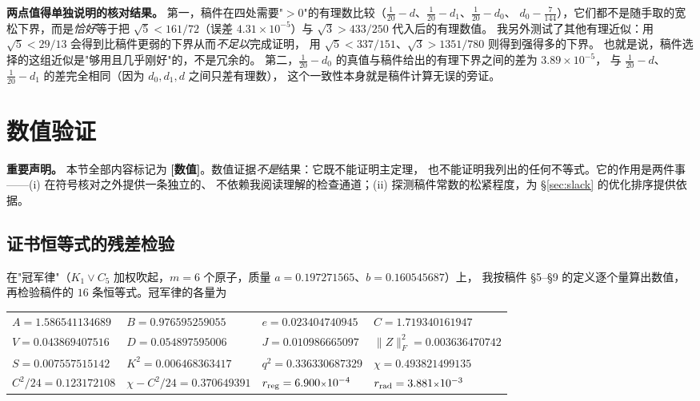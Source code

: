\documentclass[UTF8,11pt]{ctexart}
\theoremstyle{definition}
\newcommand{\num}{\textcolor[rgb]{0.55,0.35,0.00}{\bfseries [数值]}}
\begin{document}
\textbf{两点值得单独说明的核对结果。}
第一，稿件在四处需要"$>0$"的有理数比较（$\frac1{20}-d$、$\frac1{20}-d_1$、$\frac1{20}-d_0$、
$d_0-\frac7{144}$），它们都不是随手取的宽松下界，而是\emph{恰好}等于把
$\sqrt5<161/72$（误差 $4.31\times10^{-5}$）与 $\sqrt3>433/250$ 代入后的有理数值。
我另外测试了其他有理近似：用 $\sqrt5<29/13$ 会得到比稿件更弱的下界从而\emph{不足以}完成证明，
用 $\sqrt5<337/151$、$\sqrt3>1351/780$ 则得到强得多的下界。
也就是说，稿件选择的这组近似是"够用且几乎刚好"的，不是冗余的。
第二，$\frac1{20}-d_0$ 的真值与稿件给出的有理下界之间的差为 $3.89\times10^{-5}$，
与 $\frac1{20}-d$、$\frac1{20}-d_1$ 的差完全相同（因为 $d_0,d_1,d$ 之间只差有理数），
这个一致性本身就是稿件计算无误的旁证。

\section{数值验证}\label{sec:num}

\textbf{重要声明。} 本节全部内容标记为 \num。数值证据\emph{不是}结果：它既不能证明主定理，
也不能证明我列出的任何不等式。它的作用是两件事——(i) 在符号核对之外提供一条独立的、
不依赖我阅读理解的检查通道；(ii) 探测稿件常数的松紧程度，为 \S\ref{sec:slack} 的优化排序提供依据。

\subsection{证书恒等式的残差检验}

在"冠军律"（$K_1\vee C_5$ 加权吹起，$m=6$ 个原子，质量 $a=0.197271565$、$b=0.160545687$）上，
我按稿件 \S5--\S9 的定义逐个量算出数值，再检验稿件的 $16$ 条恒等式。冠军律的各量为
\begin{center}
\small\setlength{\tabcolsep}{4pt}
\begin{tabular}{llll}
\toprule
$A=1.586541134689$ & $B=0.976595259055$ & $e=0.023404740945$ & $C=1.719340161947$\\
$V=0.043869407516$ & $D=0.054897595006$ & $J=0.010986665097$ & $\|Z\|_F^2=0.003636470742$\\
$S=0.007557515142$ & $K^2=0.006468363417$ & $q^2=0.336330687329$ & $\chi=0.493821499135$\\
$C^2/24=0.123172108$ & $\chi-C^2/24=0.370649391$ & $r_{\rm reg}=6.900{\scriptstyle\times}10^{-4}$ & $r_{\rm rad}=3.881{\scriptstyle\times}10^{-3}$\\
\bottomrule
\end{tabular}
\end{center}
\end{document}
